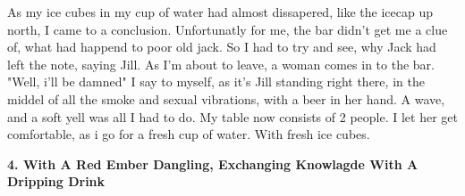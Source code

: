 \documentclass[]{article}
\begin{document}
As my ice cubes in my cup of water had almost dissapered, like the icecap up north, I came to a conclusion. Unfortunatly for me, the bar didn't get me a clue of, what had happend to poor old jack. So I had to try and see, why Jack had left the note, saying Jill. As I'm about to leave, a woman comes in to the bar. "Well, i'll be damned" I say to myself, as it's Jill standing right there, in the middel of all the smoke and sexual vibrations, with a beer in her hand. A wave, and a soft yell was all I had to do. My table now consists of 2 people. I let her get comfortable, as i go for a fresh cup of water. With fresh ice cubes.
\newpage

\begin{center}
	\large\textbf{4. With A Red Ember Dangling, \newline Exchanging Knowlagde With A Dripping Drink}
\end{center}
\end{document}
